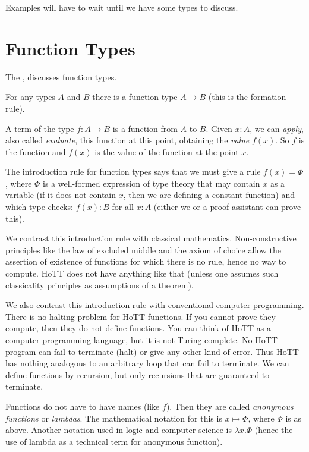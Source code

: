 \documentclass[11pt]{article}
\begin{document}
Examples will have to wait until we have some types to discuss.

\section{Function Types}

The , discusses function types.

For any types $A$ and $B$ there is a function type $A \to B$
(this is the formation rule).

A term of the type $f : A \to B$ is a function from $A$ to $B$.
Given $x : A$, we can \emph{apply}, also called \emph{evaluate},
this function at this point, obtaining the \emph{value} $f(x)$.
So $f$ is the function and $f(x)$ is the value of the function at the point
$x$.

The introduction rule for function types says that we must give a rule
$f(x) = \Phi$, where $\Phi$ is a well-formed expression of type theory
that may contain $x$ as a variable (if it does not contain $x$, then
we are defining a constant function) and which type checks: $f(x) : B$
for all $x : A$ (either we or a proof assistant can prove this).

We contrast this introduction rule with classical mathematics.
Non-constructive principles like the law of excluded middle and the
axiom of choice allow the assertion of existence of functions for which
there is no rule, hence no way to compute.  HoTT does not have anything
like that (unless one assumes such classicality principles as assumptions
of a theorem).

We also contrast this introduction rule with conventional computer programming.
There is no halting problem for HoTT functions.  If you cannot prove they
compute, then they do not define functions.  You can think of HoTT as a
computer programming language, but it is not Turing-complete.  No HoTT
program can fail to terminate (halt) or give any other kind of error.
Thus HoTT has nothing analogous to an arbitrary loop that can fail to
terminate.  We can define functions by recursion, but only recursions that
are guaranteed to terminate.

Functions do not have to have names (like $f$).
Then they are called \emph{anonymous functions} or \emph{lambdas}.
The mathematical notation for this is $x \mapsto \Phi$, where $\Phi$ is
as above.  Another notation used in logic and computer science
is $\lambda x. \Phi$ (hence the use of lambda as a technical term
for anonymous function).
\end{document}
